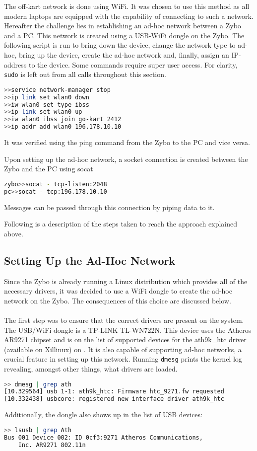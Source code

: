 The off-kart network is done using WiFi.
It was chosen to use this method as all modern laptops are equipped with the capability of connecting to such a network.
Hereafter the challenge lies in establishing an ad-hoc network between a Zybo and a PC.
This network is created using a USB-WiFi dongle on the Zybo. 
The following script is run to bring down the device, change the network type to ad-hoc, bring up the device, create the ad-hoc network and, finally, assign an IP-address to the device.
Some commands require super user access.
For clarity, \texttt{sudo} is left out from all calls throughout this section.

\begin{lstlisting}[language=bash]
>>service network-manager stop
>>ip link set wlan0 down
>>iw wlan0 set type ibss
>>ip link set wlan0 up
>>iw wlan0 ibss join go-kart 2412
>>ip addr add wlan0 196.178.10.10
\end{lstlisting}
It was verified using the ping command from the Zybo to the PC and vice versa.

Upon setting up the ad-hoc network, a socket connection is created between the Zybo and the PC using socat
\begin{lstlisting}[language=bash]
zybo>>socat - tcp-listen:2048
pc>>socat - tcp:196.178.10.10
\end{lstlisting}

Messages can be passed through this connection by piping data to it.

Following is a description of the steps taken to reach the approach explained above.
\subsection{Setting Up the Ad-Hoc Network}
Since the Zybo is already running a Linux distribution which provides all of the necessary drivers, it was decided to use a WiFi dongle to create the ad-hoc network on the Zybo.
The consequences of this choice are discussed below.
\\~\\
The first step was to ensure that the correct drivers are present on the system.
The USB/WiFi dongle is a TP-LINK TL-WN722N.
This device uses the Atheros AR9271 chipset and is on the list of supported devices for the ath9k\_htc driver (available on Xillinux) on \cite{ath9k}.
It is also capable of supporting ad-hoc networks, a crucial feature in setting up this network.
Running \texttt{dmesg} prints the kernel log revealing, amongst other things, what drivers are loaded.
\begin{lstlisting}[language=bash]
>> dmesg | grep ath
[10.329564] usb 1-1: ath9k_htc: Firmware htc_9271.fw requested
[10.332438] usbcore: registered new interface driver ath9k_htc
\end{lstlisting}
Additionally, the dongle also shows up in the list of USB devices:
\begin{lstlisting}[language=bash]
>> lsusb | grep Ath
Bus 001 Device 002: ID 0cf3:9271 Atheros Communications, 
	Inc. AR9271 802.11n
\end{lstlisting}

